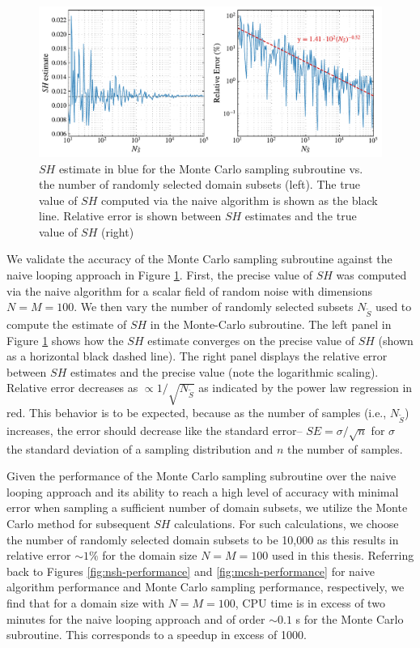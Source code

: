 \begin{figure}[!t]
	\centering
	\includegraphics[width=\textwidth]{figures/chapter2/mcNSH-accuracy-v2.pdf}
	\caption{$SH$ estimate in blue for the Monte Carlo sampling subroutine vs. the number of randomly selected domain subsets (left). The true value of $SH$ computed via the naive algorithm is shown as the black line. Relative error is shown between $SH$ estimates and the true value of $SH$ (right) }
	\label{fig:mcsh-accuracy}
\end{figure}

We validate the accuracy of the Monte Carlo sampling subroutine against the naive looping approach in Figure \ref{fig:mcsh-accuracy}. First, the precise value of $SH$ was computed via the naive algorithm for a scalar field of random noise with dimensions $N=M=100$. We then vary the number of randomly selected subsets $N_{\tilde{S}}$ used to compute the estimate of $SH$ in the Monte-Carlo subroutine. The left panel in Figure \ref{fig:mcsh-accuracy} shows how the $SH$ estimate converges on the precise value of $SH$ (shown as a horizontal black dashed line). The right panel displays the relative error between $SH$ estimates and the precise value (note the logarithmic scaling). Relative error decreases as $\propto 1/\sqrt{N_{\tilde{S}}}$ as indicated by the power law regression in red. This behavior is to be expected, because as the number of samples (i.e., $N_{\tilde{S}}$) increases, the error should decrease like the standard error-- $SE = \sigma/\sqrt{n}$ for $\sigma$ the standard deviation of a sampling distribution and $n$ the number of samples.

Given the performance of the Monte Carlo sampling subroutine over the naive looping approach and its ability to reach a high level of accuracy with minimal error when sampling a sufficient number of domain subsets, we utilize the Monte Carlo method for subsequent $SH$ calculations. For such calculations, we choose the number of randomly selected domain subsets to be 10,000 as this results in relative error $\sim 1\%$ for the domain size $N=M=100$ used in this thesis. Referring back to Figures \ref{fig:nsh-performance} and \ref{fig:mcsh-performance} for naive algorithm performance and Monte Carlo sampling performance, respectively, we find that for a domain size with $N=M=100$, CPU time is in excess of two minutes for the naive looping approach and of order $\sim0.1$ \si{s} for the Monte Carlo subroutine. This corresponds to a speedup in excess of 1000.

